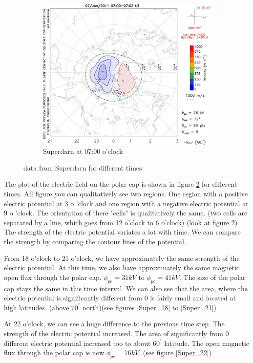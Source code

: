 \documentclass[10pt,a4paper]{article}
\begin{document}
\begin{figure}[h]
\begin{subfigure}{0.3\textwidth}
	\includegraphics[width=\textwidth]{Superdarn14.jpg}
	\caption{ Superdarn at 07:00 o'clock \label{Super_07}}
\end{subfigure}
\caption{data from Superdarn for different times}
\label{Super_overview}
\end{figure}
The plot of the electric field on the polar cap is shown in figure \ref{Super_overview} for different times. 
All figure you can qualitatively see two regions. One region with a positive electric potential at 3 o 'clock and one region with a negative electric potential at 9 o 'clock. 
The orientation of there "cells" is qualitatively the same. (two cells are separated by a line, which goes from 12 o'clock to 6 o'clock) (look at figure \ref{Super_overview}) 
The strength of the electric potential variates a lot with time. We can compare the strength by comparing the contour lines of the potential. 

From 18 o'clock to 21 o'clock, we have approximately the same strength of the electric potential. At this time, we also have approximately the same magnetic open flux through the polar cap. $\phi_{pc}=31kV$ to $\phi_{pc}=41 k V $. The size of the polar cap stays the same in this time interval. We can also see that the area, where the electric potential is significantly different from 0 is fairly small and located at high latitudes. (above $70^{°}$ north)(see figures \ref{Super_18} to \ref{Super_21})

At 22 o'clock, we can see a huge difference to the previous time step. The strength of the electric potential increased. The area of significantly from 0 different electric potential increased too to about $60^{°}$ latitude. The open magnetic flux through the polar cap is now $\phi_{pc}=76 k V$. (see figure \ref{Super_22})
\end{document}

